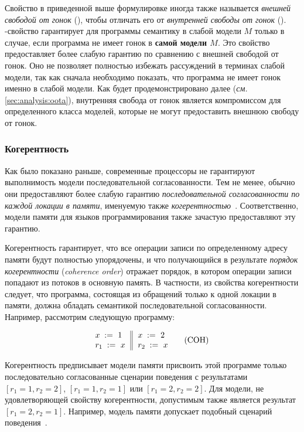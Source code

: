 Свойство \DRF в приведенной  выше формулировке иногда также называется
\emph{внешней свободой от гонок} (\eDRF), 
чтобы отличать его от \emph{внутренней свободы от гонок} (\iDRF).
\iDRF-свойство гарантирует для программы семантику \SC
в слабой модели $M$ только в случае, если программа 
не имеет гонок в \textbf{самой модели $M$}.
Это свойство предоставляет более слабую гарантию
по сравнению с внешней свободой от гонок. 
Оно не позволяет полностью избежать рассуждений 
в терминах слабой модели, так как 
сначала необходимо показать, что программа не имеет гонок именно в слабой модели. 
Как будет продемонстрировано далее (\emph{см.} \cref{sec:analysis:oota}), 
внутренняя свобода от гонок является компромиссом 
для определенного класса моделей, которые не могут 
предоставить внешнюю свободу от гонок. 

\subsubsection{Когерентность}
\label{sec:background:coh}

Как было показано раньше, современные процессоры
не гарантируют выполнимость модели последовательной согласованности. 
Тем не менее, обычно они предоставляют более слабую 
гарантию \emph{последовательной согласованности 
по каждой локации в памяти}, именуемую также 
\emph{когерентностью}~\cite{Alglave-al:TOPLAS14}. 
Соответственно, модели памяти 
для языков программирования также зачастую предоставляют эту гарантию.

Когерентность гарантирует, что все операции записи 
по определенному адресу памяти будут полностью упорядочены,
и что получающийся в результате \emph{порядок когерентности} 
(\emph{coherence order}) отражает порядок, 
в котором операции записи попадают из потоков в основную память.
В частности, из свойства когерентности следует, 
что программа, состоящая из обращений только 
к одной локации в памяти, должна 
обладать семантикой последовательной согласованности.
Например, рассмотрим следующую программу:

\begin{equation*}
\inarrII{
   \writeInst{}{x}{1}   \\
   \readInst{}{r_1}{x}  \\
}{
   \writeInst{}{x}{2}   \\
   \readInst{}{r_2}{x}  \\
}
\tag{COH}\label{ex:coh}
\end{equation*}

Когерентность предписывает модели памяти 
присвоить этой программе только последовательно 
согласованные сценарии поведения с результатами
${[r_1=1, r_2=2]}$, ${[r_1=1, r_2=1]}$ или ${[r_1=2, r_2=2]}$.
Для модели, не удовлетворяющей свойству когерентности, 
допустимым также является результат ${[r_1=2, r_2=1]}$.
Например, модель памяти \Java допускает подобный сценарий поведения~\cite{Manson-al:POPL05}.

